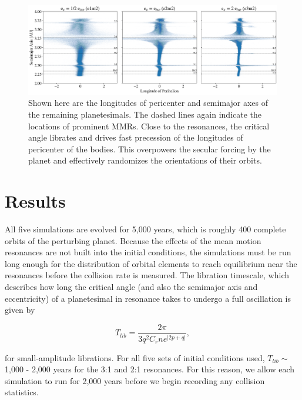 \documentclass[twocolumn]{aastex63}
\begin{document}
\begin{figure}
\begin{center}
    \includegraphics[width=\textwidth]{figures/long_ph.png}
    \caption{Shown here are the longitudes of pericenter and semimajor axes of the remaining planetesimals. The dashed lines again indicate the 
    locations of prominent MMRs. Close to the resonances, the critical angle librates and drives fast precession of the longitudes of pericenter of the 
    bodies. This overpowers the secular forcing by the planet and effectively randomizes the orientations of their orbits.\label{fig:long_ph}}
\end{center}
\end{figure}

\section{Results} \label{sec:results}

All five simulations are evolved for 5,000 years, which is roughly 400 complete orbits of the perturbing planet. Because the effects of the mean 
motion resonances are not built into the initial conditions, the simulations must be run long enough for the distribution of orbital elements to reach 
equilibrium near the resonances before the collision rate is measured. The libration timescale, which describes how long the critical angle (and also 
the semimajor axis and eccentricity) of a planetesimal in resonance takes to undergo a full oscillation is given by

\begin{equation}\label{eq:lib_time}
	T_{lib} = \frac{2 \pi}{3 q^{2} C_{r} n e^{\left| 2p + q \right|}},
\end{equation}

\noindent for small-amplitude librations. For all five sets of initial conditions used, $T_{lib} \sim$ 1,000 - 2,000 years for the 3:1 and 2:1 resonances. 
For this reason, we allow each simulation to run for 2,000 years before we begin recording any collision statistics.
\end{document}
